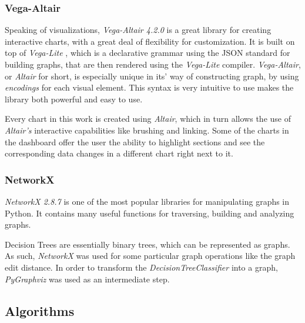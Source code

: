 \documentclass[a4paper, 12pt]{article}
\begin{document}
\subsubsection{Vega-Altair}
Speaking of visualizations, \textit{Vega-Altair 4.2.0} \cite{VanderPlas2018} is a great library for
creating interactive charts, with a great deal of flexibility for customization. It is built
on top of \textit{Vega-Lite} \cite{Satyanarayan2017}, which is a declarative grammar using
the JSON standard for building graphs, that are then rendered using the \textit{Vega-Lite}
compiler. \textit{Vega-Altair}, or \textit{Altair} for short, is especially unique in its'
way of constructing graph, by using \textit{encodings} for each visual element. This syntax
is very intuitive to use makes the library both powerful and easy to use. \par
Every chart in this work is created using \textit{Altair}, which in turn allows the use of
\textit{Altair's} interactive capabilities like brushing and linking. Some of the charts in the
dashboard offer the user the ability to highlight sections and see the corresponding data changes
in a different chart right next to it.

\subsubsection{NetworkX}
\textit{NetworkX 2.8.7} \cite{SciPyProceedings_11} is one of the most popular libraries for
manipulating graphs in Python. It contains many useful functions for traversing, building
and analyzing graphs. \par
Decision Trees are essentially binary trees, which can be represented as graphs. As such,
\textit{NetworkX} was used for some particular graph operations like the graph edit distance.
In order to transform the \textit{DecisionTreeClassifier} into a graph, \textit{PyGraphviz}
was used as an intermediate step.

\subsection{Algorithms}
\end{document}
